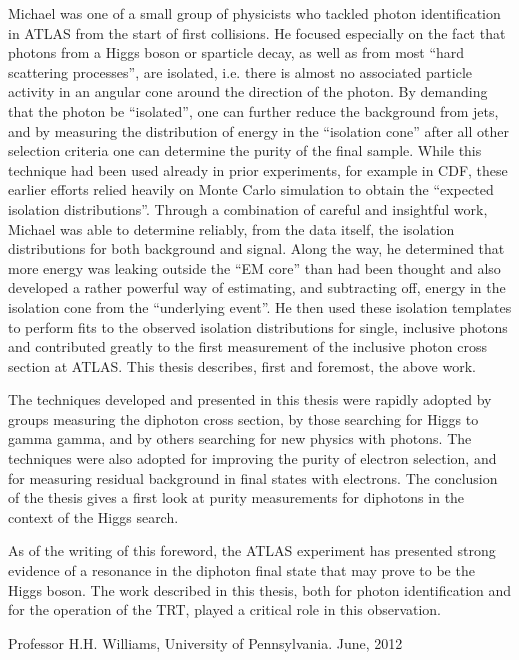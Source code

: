 	Michael was one of a small group of physicists who tackled photon identification in ATLAS from the start of first collisions. He focused especially on the fact that photons from a Higgs boson or sparticle decay, as well as from  most “hard scattering processes”, are isolated, i.e. there is almost no associated particle activity in an angular cone around the direction of the photon. By demanding that the photon be “isolated”, one can further reduce the background from jets, and by measuring the distribution of energy in the “isolation cone” after all other selection criteria one can determine the purity of the final sample. While this technique had been used already in prior experiments, for example in CDF, these earlier efforts relied heavily on Monte Carlo simulation to obtain the “expected isolation distributions”.  Through a combination of careful and insightful work, Michael was able to determine reliably, from the data itself, the isolation distributions for both background and signal. Along the way, he determined that more energy was leaking outside the “EM core” than had been thought and also developed a rather powerful way of estimating, and subtracting off, energy in the isolation cone from the “underlying event”.  He then used these isolation templates to perform fits to the observed isolation distributions for single, inclusive photons and contributed greatly to the first measurement of the inclusive photon cross section at ATLAS. This thesis describes, first and foremost, the above work.

	The techniques developed and presented in this thesis were rapidly adopted by groups measuring the diphoton cross section, by those searching for Higgs to gamma gamma, and by others searching for new physics with photons. The techniques were also adopted for improving the purity of electron selection, and for measuring residual background in final states with electrons.  The conclusion of the thesis gives a first look at purity measurements for diphotons in the context of the Higgs search. 

As of the writing of this foreword, the ATLAS experiment has presented strong evidence of a resonance in the diphoton final state that may prove to be the Higgs boson. The work described in this thesis, both for photon identification and for the operation of the TRT, played a critical role in this observation.


\vspace*{2mm}

Professor H.H. Williams, University of Pennsylvania. June, 2012

